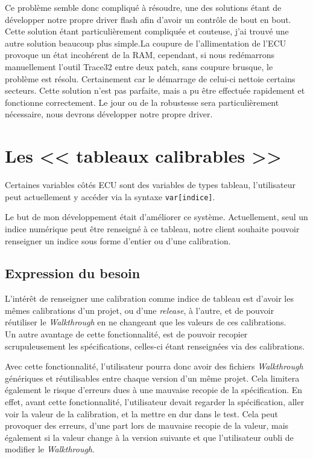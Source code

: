 Ce problème semble donc compliqué à résoudre, une des solutions étant de développer notre propre driver flash afin d'avoir un contrôle de bout en bout. Cette solution étant particulièrement compliquée et couteuse, j'ai trouvé une autre solution beaucoup plus simple.\newline La coupure de l'allimentation de l'ECU provoque un état incohérent de la RAM, cependant, si nous redémarrons manuellement l'outil Trace32 entre deux patch, sans coupure brusque, le problème est résolu. Certainement car le démarrage de celui-ci nettoie certains secteurs. Cette solution n'est pas parfaite, mais a pu être effectuée rapidement et fonctionne correctement. Le jour ou de la robustesse sera particulièrement nécessaire, nous devrons développer notre propre driver.

\section{Les << tableaux calibrables >>}
Certaines variables côtés ECU sont des variables de types tableau, l’utilisateur peut actuellement y accéder via la syntaxe \texttt{var[indice]}.

Le but de mon développement était d’améliorer ce système. Actuellement, seul un indice numérique peut être renseigné à ce tableau, notre client souhaite pouvoir renseigner un indice sous forme d'entier ou d'une calibration.

\subsection{Expression du besoin}\label{besoinTab}
L'intérêt de renseigner une calibration comme indice de tableau est d’avoir les mêmes calibrations d’un projet, ou d'une \textit{release}, à l’autre, et de pouvoir réutiliser le \textit{Walkthrough} en ne changeant que les valeurs de ces calibrations.\\
Un autre avantage de cette fonctionnalité, est de pouvoir recopier scrupuleusement les spécifications, celles-ci étant renseignées via des calibrations.

Avec cette fonctionnalité, l'utilisateur pourra donc avoir des fichiers \textit{Walkthrough} génériques et réutilisables entre chaque version d'un même projet. Cela limitera également le risque d'erreurs dues à une mauvaise recopie de la spécification. En effet, avant cette fonctionnalité, l'utilisateur devait regarder la spécification, aller voir la valeur de la calibration, et la mettre en dur dans le test. Cela peut provoquer des erreurs, d'une part lors de mauvaise recopie de la valeur, mais également si la valeur change à la version suivante et que l'utilisateur oubli de modifier le \textit{Walkthrough}.

